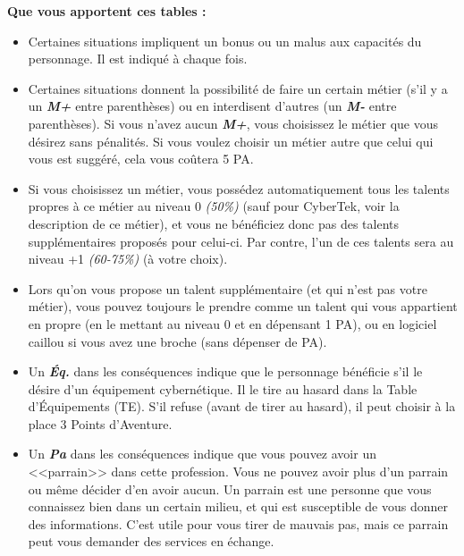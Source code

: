 \documentclass[11pt,twoside,a4paper]{article}
\begin{document}
\begin{multicols*}{2}
\textbf{\large Que vous apportent ces tables : } %
\begin{itemize}
	\small
	\item Certaines situations impliquent un bonus ou un malus aux capacit{\'e}s du personnage. Il est indiqu{\'e} {\`a} chaque fois. 
	\item Certaines situations donnent la possibilit{\'e} de faire un certain m{\'e}tier (s'il y a un \emph{\textbf{M+}} entre parenth{\`e}ses) ou en interdisent d'autres (un \emph{\textbf{M-}} entre parenth{\`e}ses). Si vous n'avez aucun \emph{\textbf{M+}}, vous choisissez le m{\'e}tier que vous d{\'e}sirez sans p{\'e}nalit{\'e}s. Si vous voulez choisir un m{\'e}tier autre que celui qui vous est sugg{\'e}r{\'e}, cela vous co{\^u}tera 5 PA. 
	\item Si vous choisissez un m{\'e}tier, vous poss{\'e}dez automatiquement tous les talents propres {\`a} ce m{\'e}tier au niveau 0 \emph{(50\%)} (sauf pour CyberTek, voir la description de ce m{\'e}tier), et vous ne b{\'e}n{\'e}ficiez donc pas des talents suppl{\'e}mentaires propos{\'e}s pour celui-ci. Par contre, l'un de ces talents sera au niveau +1 \emph{(60-75\%)} ({\`a} votre choix). 
	\item Lors qu'on vous propose un talent suppl{\'e}mentaire (et qui n'est pas votre m{\'e}tier), vous pouvez toujours le prendre comme un talent qui vous appartient en propre (en le mettant au niveau 0 et en d{\'e}pensant 1 PA), ou en logiciel caillou si vous avez une broche (sans d{\'e}penser de PA). 
	\item Un \emph{\textbf{{\'E}q.}} dans les cons{\'e}quences indique que le personnage b{\'e}n{\'e}ficie s'il le d{\'e}sire d'un {\'e}quipement cybern{\'e}tique. Il le tire au hasard dans la Table d'{\'E}quipements (TE). S'il refuse (avant de tirer au hasard), il peut choisir {\`a} la place 3 Points d'Aventure. 
	\item Un \emph{\textbf{Pa}} dans les cons{\'e}quences indique que vous pouvez avoir un <<parrain>> dans cette profession. Vous ne pouvez avoir plus d'un parrain ou m{\^e}me d{\'e}cider d'en avoir aucun. Un parrain est une personne que vous connaissez bien dans un certain milieu, et qui est susceptible de vous donner des informations. C'est utile pour vous tirer de mauvais pas, mais ce parrain peut vous demander des services en {\'e}change.  
\end{itemize} %


\end{multicols*}
\end{document}
